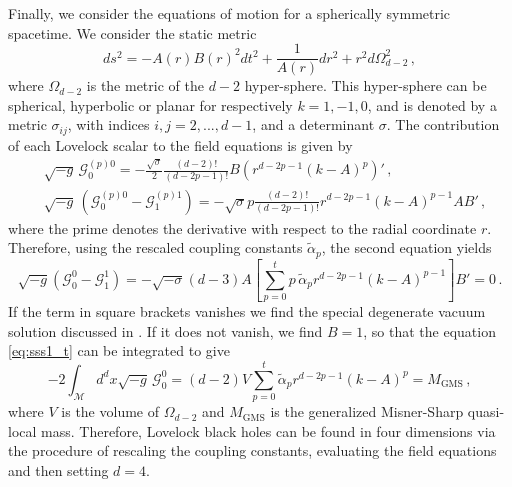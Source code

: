 \documentclass[aps,prd,preprint,nofootinbib]{revtex4-1}
\begin{document}
Finally, we consider the equations of motion for a spherically symmetric spacetime. We consider the static metric
\begin{equation}
    ds^2 = - A(r) B(r)^2 dt^2 + \frac{1}{A(r)} dr^2 + r^2 d\Omega_{d-2}^2\,,  \label{eq:metricsss}
\end{equation}
where $\Omega_{d-2}$ is the metric of the $d-2$ hyper-sphere. This hyper-sphere can be spherical, hyperbolic or planar for respectively $k=1,-1,0$, and is denoted by a metric $\sigma_{ij}$, with indices $i,j=2, ..., d-1$, and a determinant $\sigma$. The contribution of each Lovelock scalar to the field equations is given by 
\begin{align}
& \sqrt{-g} \,\mathcal{G}^{(p)0}_{0} =-\frac{\sqrt{\sigma}}{2}  \frac{(d-2)!}{(d-2p-1)!} B \left( r^{d-2p-1}  \left( k-A \right)^{p}   \right)'  \,,\label{eq:sss1_t}\\
&              
 \sqrt{-g} \,\left(\mathcal{G}^{(p)0}_{0}- \mathcal{G}^{(p)1}_{1} \right) =- \sqrt{\sigma} p \frac{(d-2)!}{(d-2p-1)!} r^{d-2p-1} \left( k-A \right)^{p-1} A B' \,,\label{eq:sss2_t}
\end{align}
where the prime denotes the derivative with respect to the radial coordinate $r$. Therefore, using the rescaled coupling constants $\tilde{\alpha}_p$, the second equation yields 
\begin{equation}
 \sqrt{-g}\left(\mathcal{G}^{0}_{0}- \mathcal{G}^{1}_{1} \right) =- \sqrt{-\sigma} (d-3) A  \left[ \sum_{p=0}^t p \, \tilde{\alpha}_p r^{d-2p-1} \left(k-A\right)^{p-1} \right] B' =0 \, . \label{eq:sss1}
\end{equation}
If the term in square brackets vanishes we find  the special degenerate vacuum solution discussed  in \cite{Maeda}. If it does not vanish, we find  $B=1$, so that the equation \eqref{eq:sss1_t} can be integrated to give
\begin{equation}
-2\int_\mathcal{M} d^d x \sqrt{-g} \,\mathcal{G}^{0}_{0} =  (d-2) V \sum_{p=0}^t \tilde{\alpha}_p r^{d-2p-1}\left(k-A\right)^p =  M_{\text{GMS}}  \, ,  \label{eq:sss2}
\end{equation}
where $V$ is the volume of $\Omega_{d-2}$ and $M_{\text{GMS}}$ is the generalized Misner-Sharp quasi-local mass. Therefore, Lovelock black holes can be found in four dimensions via the procedure of rescaling the coupling constants, evaluating the field equations and then setting $d=4$. 
\end{document}
